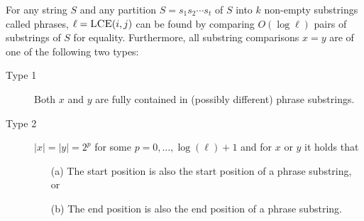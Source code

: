 \begin{lemma}\label{lem:lce-comparisons}
For any string $S$ and any partition $S=s_1 s_2 \cdots s_t$ of $S$ into $k$ non-empty substrings called phrases, $\ell=\textsc{LCE}(i,j)$ can be found by comparing $O(\log \ell)$ pairs of substrings of $S$ for equality. Furthermore, all substring comparisons $x=y$ are of one of the following two types:
\begin{description}
\item[Type 1] Both $x$ and $y$ are fully contained in (possibly different) phrase substrings.
\item[Type 2] $|x|=|y|=2^p$ for some $p=0,\ldots,\log(\ell)+1$ and for $x$ or $y$ it holds that
\begin{enumerate}
\item[(a)] The start position is also the start position of a phrase substring, or
\item[(b)] The end position is also the end position of a phrase substring.
\end{enumerate}
\end{description}
\end{lemma}
